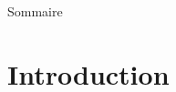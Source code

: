\documentclass[aspectratio=43,8pt]{beamer}
\begin{document}


\begin{frame}{Sommaire}
\tableofcontents[part=1]  %
\tableofcontents[part=2] 
\end{frame}

\part{Introduction}
\end{document}
